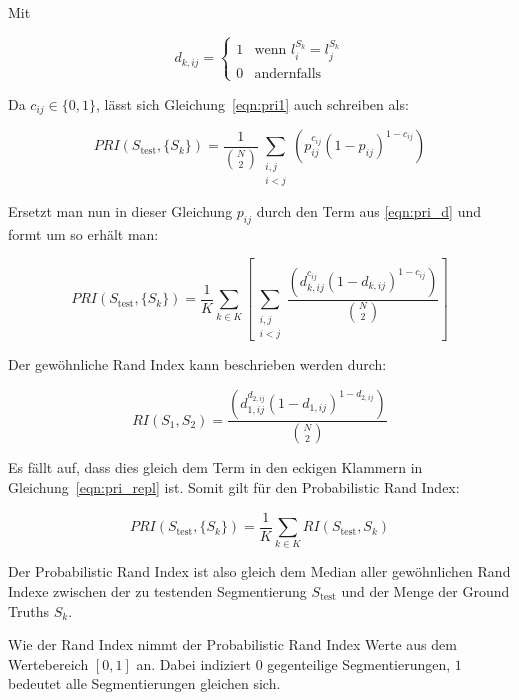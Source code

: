 Mit

\begin{equation}
\label{eqn:pri_d}
d_{k, ij} = \begin{cases}
1 & \text{wenn } l_i^{S_k}=l_j^{S_k}\\
0 & \text{andernfalls}
\end{cases}
\end{equation}

Da $c_{ij}\in\{0,1\}$, lässt sich Gleichung~\ref{eqn:pri1} auch schreiben als: \cite{pantofaru_07}

\begin{equation}
PRI(S_\text{test}, \{S_k\}) = \frac{1}{\binom{N}{2}} \sum_{\substack{i,j\\i<j}} \left(p_{ij}^{c_{ij}}\left(1-p_{ij}\right)^{1-c_{ij}}\right)
\end{equation}

Ersetzt man nun in dieser Gleichung $p_{ij}$ durch den Term aus \ref{eqn:pri_d} und formt um so erhält man:

\begin{equation}
\label{eqn:pri_repl}
PRI(S_\text{test}, \{S_k\}) = \frac{1}{K}\sum_{k\in K}\left[ \sum_{\substack{i,j\\i<j}}\frac{\left(d_{k,ij}^{c_{ij}}\left(1-d_{k,ij}\right)^{1-c_{ij}}\right)}{\binom{N}{2}}\right]
\end{equation}

Der gewöhnliche Rand Index kann beschrieben werden durch:

\begin{equation}
RI(S_1, S_2) = \frac{\left(d_{1,ij}^{d_{2,ij}}\left(1-d_{1,ij}\right)^{1-d_{2,ij}}\right)}{\binom{N}{2}}
\end{equation}

Es fällt auf, dass dies gleich dem Term in den eckigen Klammern in Gleichung~\ref{eqn:pri_repl} ist. Somit gilt für den Probabilistic Rand Index:

\begin{equation}
PRI(S_\text{test}, \{S_k\}) = \frac{1}{K}\sum_{k\in K}RI(S_\text{test}, S_k)
\end{equation}

Der Probabilistic Rand Index ist also gleich dem Median aller gewöhnlichen Rand Indexe zwischen der zu testenden Segmentierung $S_\text{test}$ und der Menge der Ground Truths ${S_k}$.

Wie der Rand Index nimmt der Probabilistic Rand Index Werte aus dem Wertebereich $\left[0, 1\right]$ an. Dabei indiziert $0$ gegenteilige Segmentierungen, $1$ bedeutet alle Segmentierungen gleichen sich. \cite{pantofaru_07}

